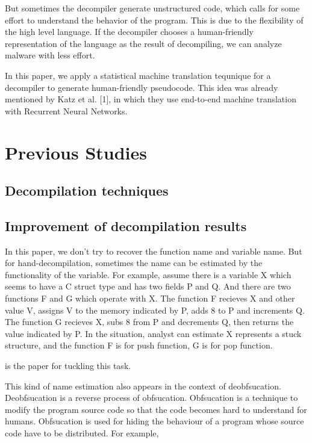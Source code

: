 \documentclass[senior,final,11pt]{iscs-thesis}
\begin{document}
But sometimes the decompiler generate  unstructured code, which calls for some effort to understand the behavior of the program. 
This is due to the flexibility of the high level language. If the decompiler chooses a human-friendly representation of the language as the result of decompiling, we can analyze malware with less effort. 

In this paper, we apply a statistical machine translation tequnique for a decompiler to generate human-friendly pseudocode. 
This idea was already mentioned by Katz et al. [1], in which they use end-to-end machine translation with Recurrent Neural Networks.

\section{Previous Studies}
\subsection{Decompilation techniques}


% 

\subsection{Improvement of decompilation results}
In this paper, we don't try to recover the function name and variable name. 
But for hand-decompilation, sometimes the name can be estimated by the functionality of the variable.
For example, assume there is a variable X which seems to have a C struct type and has two fields P and Q.
And there are two functions F and G which operate with X. 
The function F recieves X and other value V, assigns V to the memory indicated by P, adds 8 to P and increments Q. 
The function G recieves X, subs 8 from P and decrements Q, then returns the value indicated by P.
In the situation, analyst can estimate X represents a stuck structure, and the function F is for push function, G is for pop function.

\cite{name_recover_from_decompile_result} is the paper for tuckling this task.



This kind of name estimation also appears in the context of deobfsucation.
Deobfsucation is a reverse process of obfsucation.
Obfsucation is a technique to modify the program source code so that the code becomes hard to understand for humans. 
Obfsucation is used for hiding the behaviour of a program whose source code have to be distributed.
For example, 
\end{document}
